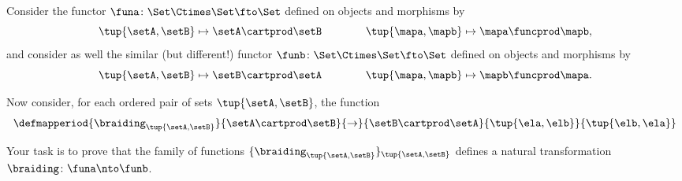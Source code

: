 \begin{gradedexercise}

    Consider the functor $\funa \colon \Set \Ctimes \Set \fto \Set$ defined on objects and morphisms by
    \begin{equation}
        \tup{\setA, \setB} \mapsto \setA \cartprod \setB \qquad \qquad \tup{\mapa, \mapb} \mapsto \mapa \funcprod \mapb,
    \end{equation}
    and consider as well the similar (but different!) functor  $\funb \colon \Set \Ctimes \Set \fto \Set$ defined on objects and morphisms by
    \begin{equation}
        \tup{\setA, \setB} \mapsto \setB \cartprod \setA \qquad \qquad \tup{\mapa, \mapb} \mapsto \mapb \funcprod \mapa.
    \end{equation}

    Now consider, for each ordered pair of sets $\tup{\setA, \setB}$, the function
    \begin{equation}\label{eq:braiding-components}
        \defmapperiod{
            \braiding_{\tup{\setA, \setB}}
        }{
            \setA \cartprod \setB
        }{
            \to
        }{
            \setB \cartprod \setA
        }{
            \tup{\ela, \elb}
        }{
            \tup{\elb, \ela}
        }
    \end{equation}

    Your task is to prove that the family of functions $\{ \braiding_{\tup{\setA, \setB}} \}_{\tup{\setA, \setB}}$ defines a natural transformation $\braiding \colon \funa \nto \funb$.

\end{gradedexercise}


